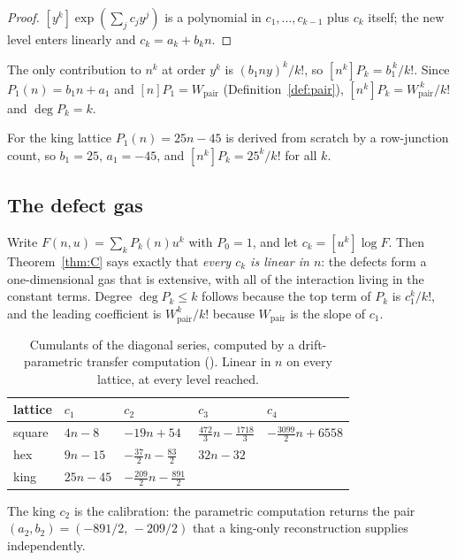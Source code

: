 \documentclass[11pt]{article}
\newcommand{\Wp}{W_{\mathrm{pair}}}
\begin{document}
\begin{proof}
$[y^k]\exp(\sum_j c_j y^j)$ is a polynomial in $c_1,\dots,c_{k-1}$ plus $c_k$
itself; the new level enters linearly and $c_k = a_k + b_k n$.
\end{proof}

\begin{corollary}
\label{cor:lead}
The only contribution to $n^k$ at order $y^k$ is $(b_1 n y)^k/k!$, so
$[n^k]P_k = b_1^{\,k}/k!$. Since $P_1(n) = b_1 n + a_1$ and $[n]P_1 = \Wp$
(Definition~\ref{def:pair}), $[n^k]P_k = \Wp^{\,k}/k!$ and $\deg P_k = k$.
\end{corollary}

For the king lattice $P_1(n) = 25n - 45$ is derived from scratch by a
row-junction count, so $b_1 = 25$, $a_1 = -45$, and $[n^k]P_k = 25^k/k!$ for all
$k$.

\subsection{The defect gas}

Write
$F(n,u) = \sum_k P_k(n)u^k$ with $P_0 = 1$, and let $c_k = [u^k]\log F$. Then
Theorem~\ref{thm:C} says exactly that \emph{every $c_k$ is linear in $n$}: the
defects form a one-dimensional gas that is extensive, with all of the interaction
living in the constant terms. Degree $\deg P_k \le k$ follows because the top term
of $P_k$ is $c_1^k/k!$, and the leading coefficient is $\Wp^k/k!$ because $\Wp$
is the slope of $c_1$.

\begin{table}[H]
\centering
\begin{tabular}{l l l l l}
\toprule
lattice & $c_1$ & $c_2$ & $c_3$ & $c_4$ \\
\midrule
square & $4n-8$  & $-19n+54$              & $\tfrac{472}{3}n-\tfrac{1718}{3}$ & $-\tfrac{3099}{2}n+6558$ \\
hex    & $9n-15$ & $-\tfrac{37}{2}n-\tfrac{83}{2}$ & $32n-32$ & \\
king   & $25n-45$ & $-\tfrac{209}{2}n-\tfrac{891}{2}$ & & \\
\bottomrule
\end{tabular}
\caption{Cumulants of the diagonal series, computed by a drift-parametric
transfer computation (). Linear in $n$ on
every lattice, at every level reached.}
\label{tab:cumulants}
\end{table}

The king $c_2$ is the calibration: the parametric computation returns the pair
$(a_2,b_2) = (-891/2,\,-209/2)$ that a king-only reconstruction supplies
independently.
\end{document}

